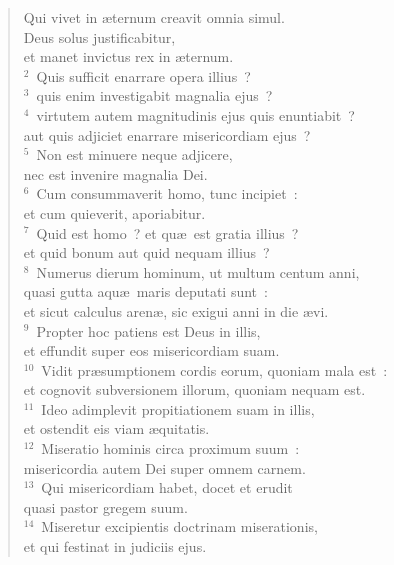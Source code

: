 \begin{flushleft}\begin{verse}\vspace{-19pt}\hspace{6pt}Qui vivet in \ae ternum creavit omnia simul.\\\hspace{6pt} Deus solus justificabitur,\\ et manet invictus rex in \ae ternum.\\
${}^{2}$~Quis sufficit enarrare opera illius~?\\
${}^{3}$~quis enim investigabit magnalia ejus~?\\
${}^{4}$~virtutem autem magnitudinis ejus quis enuntiabit~?\\ aut quis adjiciet enarrare misericordiam ejus~?\\
${}^{5}$~Non est minuere neque adjicere,\\ nec est invenire magnalia Dei.\\
${}^{6}$~Cum consummaverit homo, tunc incipiet~:\\ et cum quieverit, aporiabitur.\\
${}^{7}$~Quid est homo~? et qu\ae\ est gratia illius~?\\ et quid bonum aut quid nequam illius~?\\
${}^{8}$~Numerus dierum hominum, ut multum centum anni,\\ quasi gutta aqu\ae\ maris deputati sunt~:\\ et sicut calculus aren\ae , sic exigui anni in die \ae vi.\\
${}^{9}$~Propter hoc patiens est Deus in illis,\\ et effundit super eos misericordiam suam.\\
${}^{10}$~Vidit pr\ae sumptionem cordis eorum, quoniam mala est~:\\ et cognovit subversionem illorum, quoniam nequam est.\\
${}^{11}$~Ideo adimplevit propitiationem suam in illis,\\ et ostendit eis viam \ae quitatis.\\
${}^{12}$~Miseratio hominis circa proximum suum~:\\ misericordia autem Dei super omnem carnem.\\
${}^{13}$~Qui misericordiam habet, docet et erudit\\ quasi pastor gregem suum.\\
${}^{14}$~Miseretur excipientis doctrinam miserationis,\\ et qui festinat in judiciis ejus.\end{verse}\end{flushleft}


